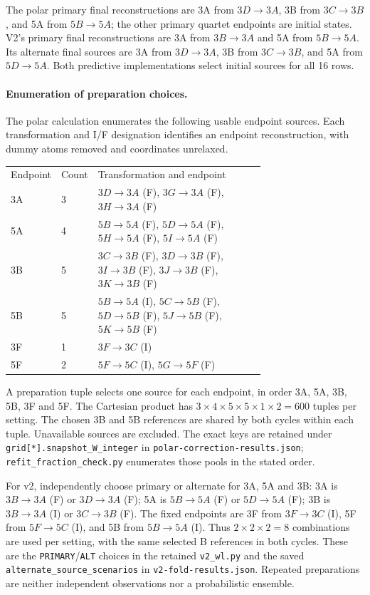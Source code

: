 \documentclass{article}
\begin{document}
The polar primary final reconstructions are 3A from \(3D\to3A\), 3B from \(3C\to3B\), and 5A from \(5B\to5A\); the other primary quartet endpoints are initial states. V2's primary final reconstructions are 3A from \(3B\to3A\) and 5A from \(5B\to5A\). Its alternate final sources are 3A from \(3D\to3A\), 3B from \(3C\to3B\), and 5A from \(5D\to5A\). Both predictive implementations select initial sources for all 16 rows.

\paragraph{Enumeration of preparation choices.}
The polar calculation enumerates the following usable endpoint sources. Each transformation and I/F designation identifies an endpoint reconstruction, with dummy atoms removed and coordinates unrelaxed.
\begin{center}\begin{tabular}{llp{0.71\linewidth}}
Endpoint & Count & Transformation and endpoint \\
3A & 3 & \(3D\to3A\) (F), \(3G\to3A\) (F), \(3H\to3A\) (F) \\
5A & 4 & \(5B\to5A\) (F), \(5D\to5A\) (F), \(5H\to5A\) (F), \(5I\to5A\) (F) \\
3B & 5 & \(3C\to3B\) (F), \(3D\to3B\) (F), \(3I\to3B\) (F), \(3J\to3B\) (F), \(3K\to3B\) (F) \\
5B & 5 & \(5B\to5A\) (I), \(5C\to5B\) (F), \(5D\to5B\) (F), \(5J\to5B\) (F), \(5K\to5B\) (F) \\
3F & 1 & \(3F\to3C\) (I) \\
5F & 2 & \(5F\to5C\) (I), \(5G\to5F\) (F) \\
\end{tabular}\end{center}
A preparation tuple selects one source for each endpoint, in order 3A, 5A, 3B, 5B, 3F and 5F. The Cartesian product has \(3\times4\times5\times5\times1\times2=600\) tuples per setting. The chosen 3B and 5B references are shared by both cycles within each tuple. Unavailable sources are excluded. The exact keys are retained under \texttt{grid[*].snapshot\_W\_integer} in \texttt{polar-correction-results.json}; \texttt{refit\_fraction\_check.py} enumerates those pools in the stated order.

For v2, independently choose primary or alternate for 3A, 5A and 3B: 3A is \(3B\to3A\) (F) or \(3D\to3A\) (F); 5A is \(5B\to5A\) (F) or \(5D\to5A\) (F); 3B is \(3B\to3A\) (I) or \(3C\to3B\) (F). The fixed endpoints are 3F from \(3F\to3C\) (I), 5F from \(5F\to5C\) (I), and 5B from \(5B\to5A\) (I). Thus \(2\times2\times2=8\) combinations are used per setting, with the same selected B references in both cycles. These are the \texttt{PRIMARY}/\texttt{ALT} choices in the retained \texttt{v2\_wl.py} and the saved \texttt{alternate\_source\_scenarios} in \texttt{v2-fold-results.json}. Repeated preparations are neither independent observations nor a probabilistic ensemble.
\end{document}
